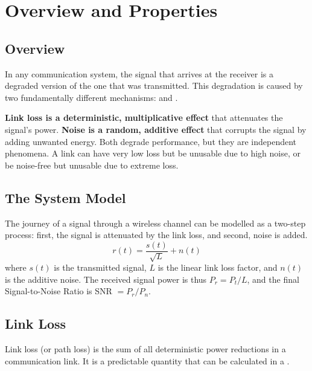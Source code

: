 \section{Overview and Properties}

\subsection{Overview}

In any communication system, the signal that arrives at the receiver is a degraded version of the one that was transmitted. This degradation is caused by two fundamentally different mechanisms:  and .

\begin{keyconcept}
    \textbf{Link loss is a deterministic, multiplicative effect} that attenuates the signal's power. \textbf{Noise is a random, additive effect} that corrupts the signal by adding unwanted energy. Both degrade performance, but they are independent phenomena. A link can have very low loss but be unusable due to high noise, or be noise-free but unusable due to extreme loss.
\end{keyconcept}


\subsection{The System Model}

The journey of a signal through a wireless channel can be modelled as a two-step process: first, the signal is attenuated by the link loss, and second, noise is added.
\begin{equation}
    r(t) = \frac{s(t)}{\sqrt{L}} + n(t)
\end{equation}
where $s(t)$ is the transmitted signal, $L$ is the linear link loss factor, and $n(t)$ is the additive noise. The received signal power is thus $P_r = P_t / L$, and the final Signal-to-Noise Ratio is SNR $= P_r / P_n$.


\subsection{Link Loss}

Link loss (or path loss) is the sum of all deterministic power reductions in a communication link. It is a predictable quantity that can be calculated in a .


